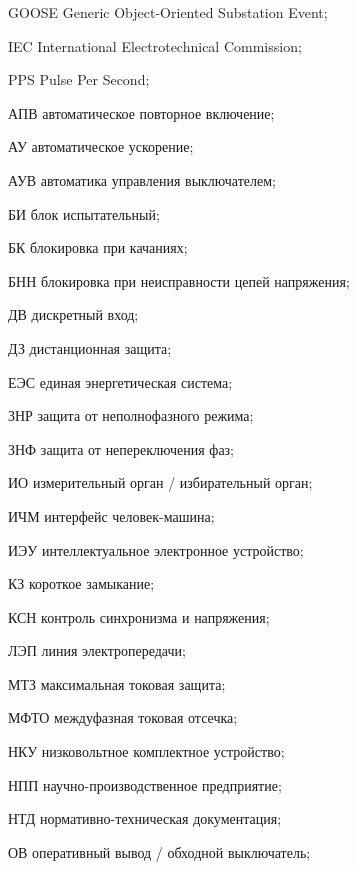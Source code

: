 \begin{list}{}%
{%
  \setlength{\labelwidth}{\abbrwidth}%
  \setlength{\labelsep}{0pt}%
  \setlength{\leftmargin}{\dimexpr\labelwidth+\labelsep\relax}%
  \setlength{\itemindent}{0pt}%
  \setlength{\parsep}{0pt}%
  \setlength{\itemsep}{0pt}
  \renewcommand{\makelabel}[1]{#1 --\hspace{\abbrgap}}%
}
\item[GOOSE] Generic Object-Oriented Substation Event;
\item[IEC]  International Electrotechnical Commission;
\item[PPS] Pulse Per Second;
\item[АПВ] автоматическое повторное включение;
\item[АУ] автоматическое ускорение;
\item[АУВ] автоматика управления выключателем;
\item[БИ] блок испытательный;
\item[БК] блокировка при качаниях;
\item[БНН] блокировка при неисправности цепей напряжения;
\item[ДВ] дискретный вход;
\item[ДЗ] дистанционная защита;
\item[ЕЭС] единая энергетическая система;
\item[ЗНР] защита от неполнофазного режима;
\item[ЗНФ] защита от непереключения фаз;
\item[ИО] измерительный орган / избирательный орган;
\item[ИЧМ] интерфейс человек-машина;
\item[ИЭУ] интеллектуальное электронное устройство;
\item[КЗ] короткое замыкание;
\item[КСН] контроль синхронизма и напряжения;
\item[ЛЭП] линия электропередачи;
\item[МТЗ] максимальная токовая защита;
\item[МФТО] междуфазная токовая отсечка;
\item[НКУ] низковольтное комплектное устройство;
\item[НПП] научно-производственное предприятие;
\item[НТД] нормативно-техническая документация;
\item[ОВ] оперативный вывод / обходной выключатель;

\end{list}
